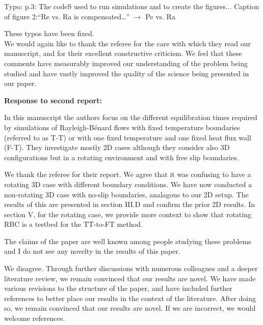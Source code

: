 \documentclass[aps, 11pt, singlecolumn]{revtex4-1} %
\begin{document}
\begin{singlespace}
\begin{myquotation}
Typo:
p.3: The codeS used to run simulations and to create the figures...
Caption of figure 2:``Re vs. Ra is compensated…'' $\rightarrow$ Pe vs. Ra
\end{myquotation}
These typos have been fixed.
\\

\vspace{0.5cm}
We would again like to thank the referee for the care with which they read our manuscript, and for their excellent constructive criticism.
We feel that these comments have measurably improved our understanding of the problem being studied and have vastly improved the quality of the science being presented in our paper.

\newpage
\noindent
\Large{\textbf{Response to second report:}}\newline$\,$\newline\indent
\begin{myquotation}
In this manuscript the authors focus on the different equilibration times required by simulations of Rayleigh-B\'{e}nard flows with fixed temperature boundaries (referred to as T-T) or with one fixed temperature and one fixed heat flux wall (F-T). 
They investigate mostly 2D cases although they consider also 3D configurations but in a rotating environment and with free slip boundaries. 
\end{myquotation}
We thank the referee for their report.
We agree that it was confusing to have a rotating 3D case with different boundary conditions.
We have now conducted a non-rotating 3D case with no-slip boundaries, analagous to our 2D setup.
The results of this are presented in section III.D and confirm the prior 2D results.
In section V, for the rotating case, we provide more context to show that rotating RBC is a testbed for the TT-to-FT method.

\begin{myquotation}
The claims of the paper are well known among people studying these problems and I do not see any novelty in the results of this paper. 
\end{myquotation}
We disagree.
Through further discussions with numerous colleagues and a deeper literature review, we remain convinced that our results are novel.
We have made various revisions to the structure of the paper, and have included further references to better place our results in the context of the literature.
After doing so, we remain convinced that our results are novel.
If we are incorrect, we would welcome references.


\end{singlespace}
\end{document}
